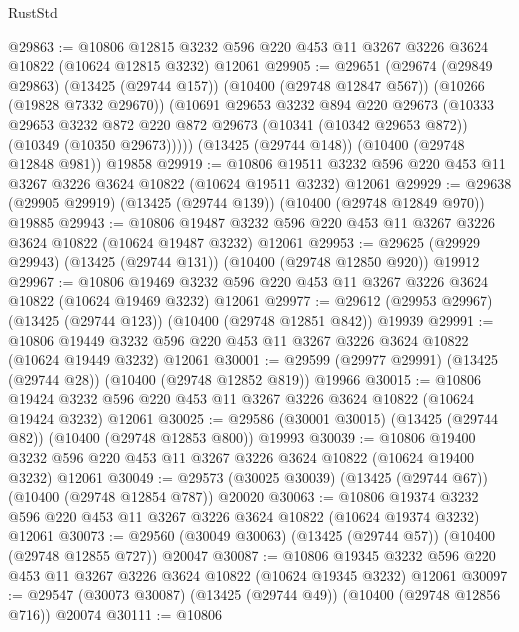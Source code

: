 \begin{lexlean}{RustStd}
\begin{coremodule}
{\begin{coremodule}
{{{{{{{{{{{{{{{{{{{{{{{{{@29863 := @10806
    @12815
    @3232
    @596
    @220
    @453
    @11
    @3267
    @3226
    @3624
    @10822
    (@10624 @12815 @3232)
    @12061
@29905 := @29651
    (@29674
      (@29849 @29863)
      (@13425 (@29744 @157))
      (@10400 (@29748 @12847 @567))
      (@10266 (@19828 @7332 @29670))
      (@10691
        @29653
        @3232
        @894
        @220
        @29673
        (@10333
          @29653
          @3232
          @872
          @220
          @872
          @29673
          (@10341 (@10342 @29653 @872))
          (@10349 (@10350 @29673)))))
    (@13425 (@29744 @148))
    (@10400 (@29748 @12848 @981))
    @19858
@29919 := @10806
    @19511
    @3232
    @596
    @220
    @453
    @11
    @3267
    @3226
    @3624
    @10822
    (@10624 @19511 @3232)
    @12061
@29929 := @29638 (@29905 @29919) (@13425 (@29744 @139)) (@10400 (@29748 @12849 @970)) @19885
@29943 := @10806
    @19487
    @3232
    @596
    @220
    @453
    @11
    @3267
    @3226
    @3624
    @10822
    (@10624 @19487 @3232)
    @12061
@29953 := @29625 (@29929 @29943) (@13425 (@29744 @131)) (@10400 (@29748 @12850 @920)) @19912
@29967 := @10806
    @19469
    @3232
    @596
    @220
    @453
    @11
    @3267
    @3226
    @3624
    @10822
    (@10624 @19469 @3232)
    @12061
@29977 := @29612 (@29953 @29967) (@13425 (@29744 @123)) (@10400 (@29748 @12851 @842)) @19939
@29991 := @10806
    @19449
    @3232
    @596
    @220
    @453
    @11
    @3267
    @3226
    @3624
    @10822
    (@10624 @19449 @3232)
    @12061
@30001 := @29599 (@29977 @29991) (@13425 (@29744 @28)) (@10400 (@29748 @12852 @819)) @19966
@30015 := @10806
    @19424
    @3232
    @596
    @220
    @453
    @11
    @3267
    @3226
    @3624
    @10822
    (@10624 @19424 @3232)
    @12061
@30025 := @29586 (@30001 @30015) (@13425 (@29744 @82)) (@10400 (@29748 @12853 @800)) @19993
@30039 := @10806
    @19400
    @3232
    @596
    @220
    @453
    @11
    @3267
    @3226
    @3624
    @10822
    (@10624 @19400 @3232)
    @12061
@30049 := @29573 (@30025 @30039) (@13425 (@29744 @67)) (@10400 (@29748 @12854 @787)) @20020
@30063 := @10806
    @19374
    @3232
    @596
    @220
    @453
    @11
    @3267
    @3226
    @3624
    @10822
    (@10624 @19374 @3232)
    @12061
@30073 := @29560 (@30049 @30063) (@13425 (@29744 @57)) (@10400 (@29748 @12855 @727)) @20047
@30087 := @10806
    @19345
    @3232
    @596
    @220
    @453
    @11
    @3267
    @3226
    @3624
    @10822
    (@10624 @19345 @3232)
    @12061
@30097 := @29547 (@30073 @30087) (@13425 (@29744 @49)) (@10400 (@29748 @12856 @716)) @20074
@30111 := @10806
}}}}}}}}}}}}}}}}}}}}}}}}}
\end{coremodule}}
\end{coremodule}
\end{lexlean}
